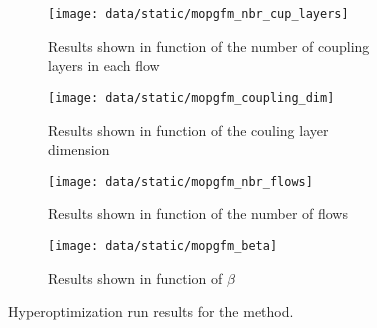 \begin{figure}
    \centering
    \begin{subfigure}[b]{0.49\textwidth}
        \centering
        \texttt{[image: data/static/mopgfm\_nbr\_cup\_layers]}
        \caption{Results shown in function of the number of coupling layers in each flow}
    \end{subfigure}
    \hfill
    \begin{subfigure}[b]{0.49\textwidth}
        \centering
        \texttt{[image: data/static/mopgfm\_coupling\_dim]}
        \caption{Results shown in function of the couling layer dimension}
    \end{subfigure}
    \hfill
    \begin{subfigure}[b]{0.49\textwidth}
        \centering
        \texttt{[image: data/static/mopgfm\_nbr\_flows]}
        \caption{Results shown in function of the number of flows}
    \end{subfigure}
    \hfill
    \begin{subfigure}[b]{0.49\textwidth}
        \centering
        \texttt{[image: data/static/mopgfm\_beta]}
        \caption{Results shown in function of $\beta$}
    \end{subfigure}
    \caption{Hyperoptimization run results for the  method.}
    \label{fig:mopgfm hyperopt}
\end{figure}

